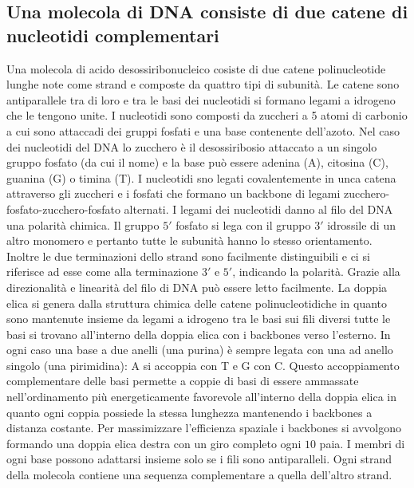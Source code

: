 \subsection{Una molecola di DNA consiste di due catene di nucleotidi complementari}
Una molecola di acido desossiribonucleico cosiste di due catene polinucleotide lunghe note come strand e composte da quattro tipi di subunit\`a. Le catene sono antiparallele tra di loro
e tra le basi dei nucleotidi si formano legami a idrogeno che le tengono unite. I nucleotidi sono composti da zuccheri a 5 atomi di carbonio a cui sono attaccadi dei gruppi fosfati e 
una base contenente dell'azoto. Nel caso dei nucleotidi del DNA lo zucchero \`e il desossiribosio attaccato a un singolo gruppo fosfato (da cui il nome) e la base pu\`o essere adenina
(A), citosina (C), guanina (G) o timina (T). I nucleotidi sno legati covalentemente in unca catena attraverso gli zuccheri e i fosfati che formano un backbone di legami 
zucchero-fosfato-zucchero-fosfato alternati. I legami dei nucleotidi danno al filo del DNA una polarit\`a chimica. Il gruppo $5'$ fosfato si lega con il gruppo $3'$ idrossile di un
altro monomero e pertanto tutte le subunit\`a hanno lo stesso orientamento. Inoltre le due terminazioni dello strand sono facilmente distinguibili e ci si riferisce ad esse come alla
terminazione $3'$ e $5'$, indicando la polarit\`a. Grazie alla direzionalit\`a e linearit\`a del filo di DNA pu\`o essere letto facilmente. La doppia elica si genera dalla struttura 
chimica delle catene polinucleotidiche in quanto sono mantenute insieme da legami a idrogeno tra le basi sui fili diversi tutte le basi si trovano all'interno della doppia elica con i 
backbones verso l'esterno. In ogni caso una base a due anelli (una purina) \`e sempre legata con una ad anello singolo (una pirimidina): A si accoppia con T e G con C. Questo 
accoppiamento complementare delle basi permette a coppie di basi di essere ammassate nell'ordinamento pi\`u energeticamente favorevole all'interno della doppia elica in quanto ogni
coppia possiede la stessa lunghezza mantenendo i backbones a distanza costante. Per massimizzare l'efficienza spaziale i backbones si avvolgono formando una doppia elica destra con
un giro completo ogni $10$ paia. I membri di ogni base possono adattarsi insieme solo se i fili sono antiparalleli. Ogni strand della molecola contiene una sequenza complementare a
quella dell'altro strand. 
